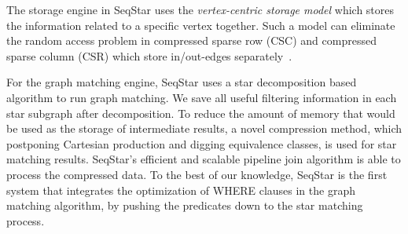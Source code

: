 The storage engine in SeqStar uses the \emph{vertex-centric storage model} which stores the information related to a specific vertex together.
Such a model can eliminate the random access problem in compressed sparse row (CSC) and compressed sparse column (CSR) which store in/out-edges separately~\cite{DBLP:conf/sc/PearceGA10,DBLP:conf/osdi/KyrolaBG12}. %

For the graph matching engine, SeqStar uses a star decomposition based algorithm to run graph matching. %
We save all useful filtering information in each star subgraph after decomposition. To reduce the amount of memory that would be used as the storage of intermediate results, a novel compression method, which postponing Cartesian production and digging equivalence classes, is used for star matching results. SeqStar's efficient and scalable pipeline join algorithm is able to process the compressed data. To the best of our knowledge, SeqStar is the first system that integrates the optimization of WHERE clauses in the graph matching algorithm, by pushing the predicates down to the star matching process.



